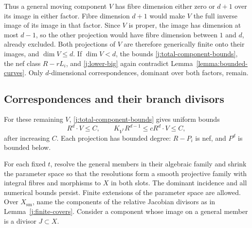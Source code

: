 \documentclass[12pt,a4paper,psamsfonts]{amsart}
\theoremstyle{definition}
\theoremstyle{plain}
\begin{document}
Thus a general moving component $V$ has fibre dimension either
zero or $d+1$ over its image in either factor. Fibre dimension
$d+1$ would make $V$ the full inverse image of its image in that
factor. Since $V$ is proper, the image has dimension at most
$d-1$, so the other projection would have fibre dimension between
$1$ and $d$, already excluded. Both projections of $V$ are
therefore generically finite onto their images, and $\dim V\le d$.
If $\dim V<d$, the bounds \eqref{j:total-component-bounds}, the
nef class $R-rL_i$, and \eqref{j:lower-big} again contradict
Lemma~\ref{lemma:bounded-curves}. Only $d$-dimensional
correspondences, dominant over both factors, remain.

\subsection{Correspondences and their branch divisors}

For these remaining $V$, \eqref{j:total-component-bounds} gives
uniform bounds
\begin{equation}\label{j:correspondence-bounds}
 R^d\cdot V\le C,
 \qquad K_{V^*}R^{d-1}\le cR^d\cdot V\le C,
\end{equation}
after increasing $C$. Each projection has bounded degree:
$R-P_i$ is nef, and $P^d$ is bounded below.

For each fixed $t$, resolve the general members in their algebraic
family and shrink the parameter space so that the resolutions form
a smooth projective family with integral fibres and morphisms to
$X$ in both slots. The dominant incidence and all numerical bounds
persist. Finite extensions of the parameter space are allowed.
Over $X_{\mathrm{sm}}$, name the components of the relative
Jacobian divisors as in Lemma~\ref{j:finite-covers}. Consider a
component whose image on a general member is a divisor $J\subset X$.
\end{document}
